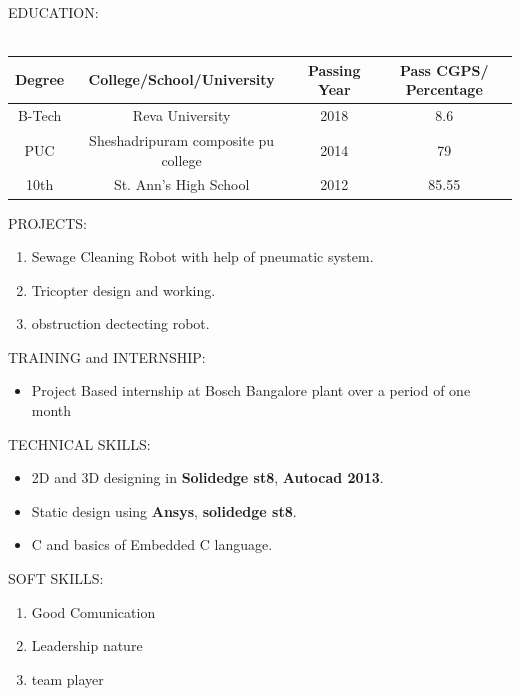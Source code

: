 \documentclass[14pt,a4paper]{article}
\begin{document}
\begin{paragraph}{\large EDUCATION:\\}
\hfill\\
\begin{tabular}{| c | c | c | c |}
\hline
\textbf{Degree} & \textbf{College/School/University} & \textbf{ Passing Year} & \textbf{ Pass CGPS/ Percentage}\\
\hline
B-Tech & Reva University & 2018 & 8.6\\
\hline
PUC & Sheshadripuram composite pu college & 2014 & 79 \\
\hline
10th & St. Ann's High School & 2012 & 85.55\\
\hline
\end{tabular}
\end{paragraph}

\begin{paragraph}{\large PROJECTS:\\}
\begin{enumerate}
\item Sewage Cleaning Robot with help of pneumatic system.
\item Tricopter design and working.
\item obstruction dectecting robot.
\end{enumerate}
\end{paragraph}


\begin{paragraph}{\large TRAINING and INTERNSHIP:\\}
\begin{itemize}
\item Project Based internship at Bosch Bangalore plant over a period of one month\\
\end{itemize}
\end{paragraph}

\begin{paragraph}{\large TECHNICAL SKILLS:\\}
\begin{itemize}
\item 2D and 3D designing in \textbf{Solidedge st8}, \textbf{Autocad 2013}.
\item Static design using  \textbf{Ansys}, \textbf{solidedge st8}.
\item C and basics of Embedded C language.
\end{itemize}
\end{paragraph}

\begin{paragraph}{\large SOFT SKILLS:\\}
\begin{enumerate}
\item Good Comunication 
\item Leadership nature
\item team player
\end{enumerate}
\end{paragraph}
\end{document}
